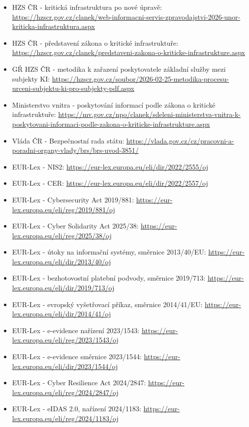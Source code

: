 \begin{itemize}
  \item HZS ČR - kritická infrastruktura po nové úpravě: \url{https://hzscr.gov.cz/clanek/web-informacni-servis-zpravodajstvi-2026-unor-kriticka-infrastruktura.aspx}
  \item HZS ČR - představení zákona o kritické infrastruktuře: \url{https://hzscr.gov.cz/clanek/predstaveni-zakona-o-kriticke-infrastrukture.aspx}
  \item GŘ HZS ČR - metodika k zařazení poskytovatele základní služby mezi subjekty KI: \url{https://hzscr.gov.cz/soubor/2026-02-25-metodika-procesu-urceni-subjektu-ki-pro-subjekty-pdf.aspx}
  \item Ministerstvo vnitra - poskytování informací podle zákona o kritické infrastruktuře: \url{https://mv.gov.cz/npo/clanek/sdeleni-ministerstva-vnitra-k-poskytovani-informaci-podle-zakona-o-kriticke-infrastrukture.aspx}
  \item Vláda ČR - Bezpečnostní rada státu: \url{https://vlada.gov.cz/cz/pracovni-a-poradni-organy-vlady/brs/brs-uvod-3851/}
  \item EUR-Lex - NIS2: \url{https://eur-lex.europa.eu/eli/dir/2022/2555/oj}
  \item EUR-Lex - CER: \url{https://eur-lex.europa.eu/eli/dir/2022/2557/oj}
  \item EUR-Lex - Cybersecurity Act 2019/881: \url{https://eur-lex.europa.eu/eli/reg/2019/881/oj}
  \item EUR-Lex - Cyber Solidarity Act 2025/38: \url{https://eur-lex.europa.eu/eli/reg/2025/38/oj}
  \item EUR-Lex - útoky na informační systémy, směrnice 2013/40/EU: \url{https://eur-lex.europa.eu/eli/dir/2013/40/oj}
  \item EUR-Lex - bezhotovostní platební podvody, směrnice 2019/713: \url{https://eur-lex.europa.eu/eli/dir/2019/713/oj}
  \item EUR-Lex - evropský vyšetřovací příkaz, směrnice 2014/41/EU: \url{https://eur-lex.europa.eu/eli/dir/2014/41/oj}
  \item EUR-Lex - e-evidence nařízení 2023/1543: \url{https://eur-lex.europa.eu/eli/reg/2023/1543/oj}
  \item EUR-Lex - e-evidence směrnice 2023/1544: \url{https://eur-lex.europa.eu/eli/dir/2023/1544/oj}
  \item EUR-Lex - Cyber Resilience Act 2024/2847: \url{https://eur-lex.europa.eu/eli/reg/2024/2847/oj}
  \item EUR-Lex - eIDAS 2.0, nařízení 2024/1183: \url{https://eur-lex.europa.eu/eli/reg/2024/1183/oj}

\end{itemize}
